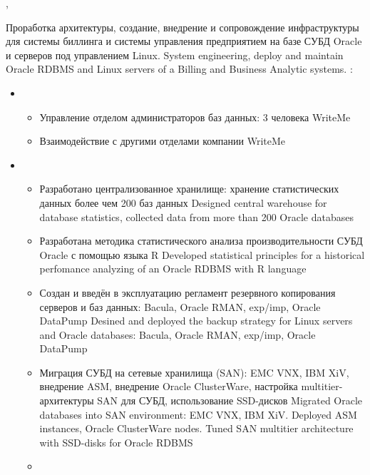 \documentclass[11pt,a4paper,sans]{moderncv}        %
\begin{document}
{\protect{}}
{\cityperm, \country}
{}
{
	{Проработка архитектуры, создание, внедрение и сопровождение инфраструктуры для системы биллинга и системы управления предприятием на базе СУБД Oracle и серверов под управлением Linux.}
	{System engineering, deploy and maintain Oracle RDBMS and Linux servers of a Billing and Business Analytic systems.}\newline{}
	\achievements:
	\begin{itemize}	
	\item {}	
		\begin{itemize}
			\item {}
				{Управление отделом администраторов баз данных: 3 человека}
				{WriteMe}
			\item {}
				{Взаимодействие с другими отделами компании}
				{WriteMe}
		\end{itemize}
	\item {}
		\begin{itemize}
			\item {}
				{Разработано централизованное хранилище: хранение статистических данных более чем 200 баз данных}
				{Designed central warehouse for database statistics, collected data from more than 200 Oracle databases}
			\item {}
				{Разработана методика статистического анализа производительности СУБД Oracle с помощью языка R}
				{Developed statistical principles for a historical perfomance analyzing of an Oracle RDBMS with R language}
			\item {}
				{Создан и введён в эксплуатацию регламент резервного копирования серверов и баз данных: Bacula, Oracle RMAN, exp/imp, Oracle DataPump}
				{Desined and deployed the backup strategy for Linux servers and Oracle databases: Bacula, Oracle RMAN, exp/imp, Oracle DataPump}
			\item {}
				{Миграция СУБД на сетевые хранилища (SAN): EMC VNX, IBM XiV, внедрение ASM, внедрение Oracle ClusterWare, настройка multitier-архитектуры SAN для СУБД, использование SSD-дисков}
				{Migrated Oracle databases into SAN environment: EMC VNX, IBM XiV. Deployed ASM instances, Oracle ClusterWare nodes. Tuned SAN multitier architecture with SSD-disks for Oracle RDBMS}
			\item {}

\end{itemize}
\end{itemize}}
\end{document}
